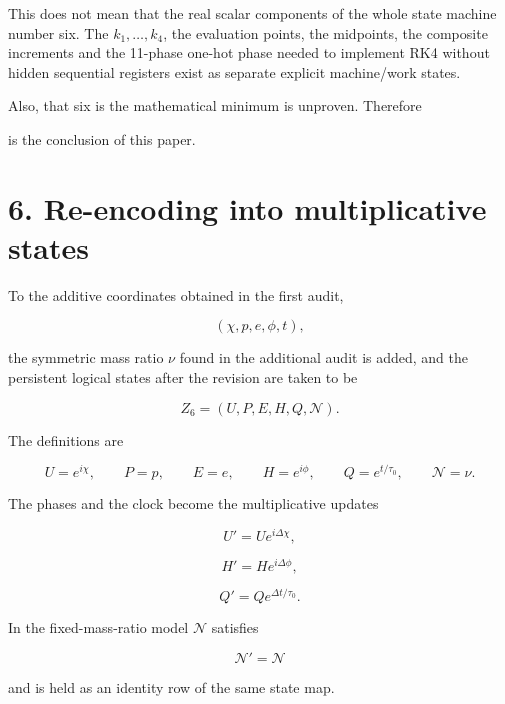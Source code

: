 \documentclass[
  a4paper,
]{article}
\begin{document}
\begin{center}
\end{center}

This does not mean that the real scalar components of the whole state
machine number six. The \(k_1,\ldots,k_4\), the evaluation points, the
midpoints, the composite increments and the 11-phase one-hot phase
needed to implement RK4 without hidden sequential registers exist as
separate explicit machine/work states.

Also, that six is the mathematical minimum is unproven. Therefore

\begin{center}
\end{center}

is the conclusion of this paper.

\section{6. Re-encoding into multiplicative
states}\label{re-encoding-into-multiplicative-states}

To the additive coordinates obtained in the first audit,

\[
(\chi,p,e,\phi,t),
\]

the symmetric mass ratio \(\nu\) found in the additional audit is added,
and the persistent logical states after the revision are taken to be

\[
\boxed{
Z_6=(U,P,E,H,Q,\mathcal N).
}
\]

The definitions are

\[
U=e^{i\chi},
\qquad P=p,
\qquad E=e,
\qquad H=e^{i\phi},
\qquad Q=e^{t/\tau_0},
\qquad \mathcal N=\nu.
\]

The phases and the clock become the multiplicative updates

\[
U'=Ue^{i\Delta\chi},
\]

\[
H'=He^{i\Delta\phi},
\]

\[
Q'=Qe^{\Delta t/\tau_0}.
\]

In the fixed-mass-ratio model \(\mathcal N\) satisfies

\[
\mathcal N'=\mathcal N
\]

and is held as an identity row of the same state map.
\end{document}
